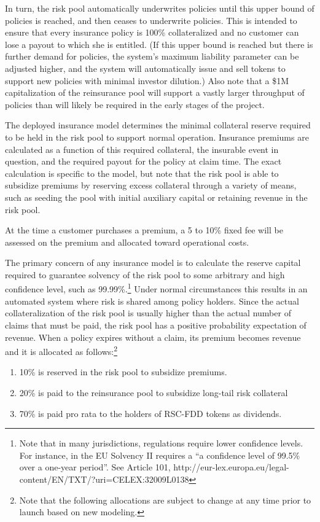 \documentclass[12pt]{article}
\begin{document}
In turn, the risk pool automatically underwrites policies until this upper bound of policies is reached, and then ceases to underwrite policies. This is intended to ensure that every insurance policy is 100\% collateralized and no customer can lose a payout to which she is entitled. (If this upper bound is reached but there is further demand for policies, the system's maximum liability parameter can be adjusted higher, and the system will automatically issue and sell tokens to support new policies with minimal investor dilution.) Also note that a \$1M capitalization of the reinsurance pool will support a vastly larger throughput of policies than will likely be required in the early stages of the project.

The deployed insurance model determines the minimal collateral reserve required to be held in the risk pool to support normal operation. Insurance premiums are calculated as a function of this required collateral, the insurable event in question, and the required payout for the policy at claim time. The exact calculation is specific to the model, but note that the risk pool is able to subsidize premiums by reserving excess collateral through a variety of means, such as seeding the pool with initial auxiliary capital or retaining revenue in the risk pool.

At the time a customer purchases a premium, a 5 to 10\% fixed fee will be assessed on the premium and allocated toward operational costs.

The primary concern of any insurance model is to calculate the reserve capital required to guarantee solvency of the risk pool to some arbitrary and high confidence level, such as 99.99\%.\footnote{Note that in many jurisdictions, regulations require lower confidence levels. For instance, in the EU Solvency II requires a ``a confidence level of 99.5\% over a one-year period''. See Article 101, http://eur-lex.europa.eu/legal-content/EN/TXT/?uri=CELEX:32009L0138} Under normal circumstances this results in an automated system where risk is shared among policy holders. Since the actual collateralization of the risk pool is usually higher than the actual number of claims that must be paid, the risk pool has a positive probability expectation of revenue. When a policy expires without a claim, its premium becomes revenue and it is allocated as follows:\footnote{Note that the following allocations are subject to change at any time prior to launch based on new modeling.}

\begin{enumerate}
    \item 10\% is reserved in the risk pool to subsidize premiums.
    \item 20\% is paid to the reinsurance pool to subsidize long-tail risk collateral
    \item 70\% is paid pro rata to the holders of RSC-FDD tokens as dividends.
\end{enumerate}
\end{document}
